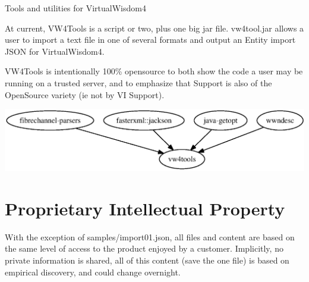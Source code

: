 Tools and utilities for Virtual\+Wisdom4

At current, V\+W4\+Tools is a script or two, plus one big jar file. vw4tool.\+jar allows a user to import a text file in one of several formats and output an Entity import J\+S\+O\+N for Virtual\+Wisdom4.

V\+W4\+Tools is intentionally 100\% opensource to both show the code a user may be running on a trusted server, and to emphasize that Support is also of the Open\+Source variety (ie not by V\+I Support).

\begin{center}

\begin{DoxyImageNoCaption}
  \mbox{\includegraphics[width=\textwidth,height=\textheight/2,keepaspectratio=true]{dot_inline_dotgraph_2}}
\end{DoxyImageNoCaption}
\end{center}


\section*{Proprietary Intellectual Property }

With the exception of samples/import01.\+json, all files and content are based on the same level of access to the product enjoyed by a customer. Implicitly, no private information is shared, all of this content (save the one file) is based on empirical discovery, and could change overnight. 
